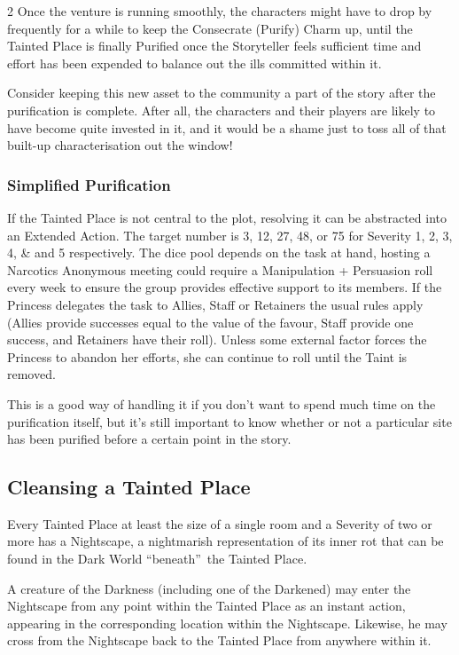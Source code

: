 \begin{multicols}{2}
Once the venture is running smoothly, the characters might have to drop by frequently for a while to keep the Consecrate (Purify) Charm up, until the Tainted Place is finally Purified once the Storyteller feels sufficient time and effort has been expended to balance out the ills committed within it.

Consider keeping this new asset to the community a part of the story after the purification is complete. After all, the characters and their players are likely to have become quite invested in it, and it would be a shame just to toss all of that built-up characterisation out the window!

\subsubsection*{Simplified Purification}

If the Tainted Place is not central to the plot, resolving it can be abstracted into an Extended Action. The target number is 3, 12, 27, 48, or 75 for Severity 1, 2, 3, 4, \& and 5 respectively. The dice pool depends on the task at hand, hosting a Narcotics Anonymous meeting could require a Manipulation + Persuasion roll every week to ensure the group provides effective support to its members. If the Princess delegates the task to Allies, Staff or Retainers the usual rules apply (Allies provide successes equal to the value of the favour, Staff provide one success, and Retainers have their roll). Unless some external factor forces the Princess to abandon her efforts, she can continue to roll until the Taint is removed.

This is a good way of handling it if you don’t want to spend much time on the purification itself, but it’s still important to know whether or not a particular site has been purified before a certain point in the story.

\subsection*{Cleansing a Tainted Place}

\label{NightscapeRef}

Every Tainted Place at least the size of a single room and a Severity of two or more has a Nightscape, a nightmarish representation of its inner rot that can be found in the Dark World \textquotedblleft beneath\textquotedblright\, the Tainted Place.

A creature of the Darkness (including one of the Darkened) may enter the Nightscape from any point within the Tainted Place as an instant action, appearing in the corresponding location within the Nightscape. Likewise, he may cross from the Nightscape back to the Tainted Place from anywhere within it.


\end{multicols}
